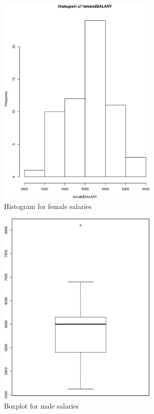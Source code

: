 \documentclass{article}
\begin{document}
\begin{figure}[ht!]
  \centering
  \includegraphics[width=0.7\textwidth]{hist_female}
  \caption{Histogram for female salaries \label{fig:histf}}
\end{figure}


\begin{figure}[ht!]
  \centering
  \includegraphics[width=0.7\textwidth]{boxplot_male}
  \caption{Boxplot for male salaries\label{fig:boxm}}
\end{figure}
\end{document}
